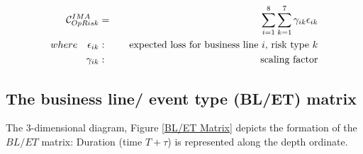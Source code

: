 \documentclass[]{DissertateUSU}
\begin{document}
\begin{eqnarray}
\mathcal{\Large{C}}_{OpRisk}^{IMA} &=& \sum_{i=1}^8 \sum_{k=1}^7 \gamma_{ik}\epsilon_{ik} \\
where \quad \epsilon_{ik}&:& \quad \mbox{expected loss for business line $i$, risk type $k$} \nonumber \\
      \gamma_{ik}&:& \quad \mbox{scaling factor} \nonumber
\end{eqnarray}

\subsection{The business line/ event type (BL/ET) matrix}

The 3-dimensional diagram, Figure \ref{BL/ET Matrix} depicts the
formation of the \(BL/ET\) matrix: Duration (time \(T+\tau\)) is
represented along the depth ordinate.
\end{document}
